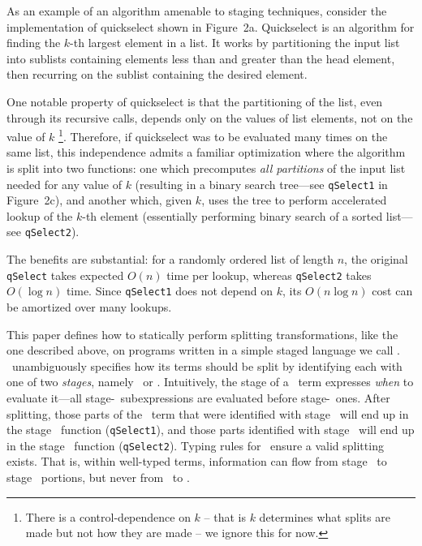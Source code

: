 As an example of an algorithm amenable to staging techniques,
consider the implementation of quickselect shown in Figure~2a.
Quickselect is an algorithm for finding the $k$-th largest element in a list.
It works by partitioning the input list into sublists containing elements less than and greater than the head element, 
then recurring on the sublist containing the desired element.

One notable property of quickselect is that the partitioning of the list, even through its recursive calls, depends only on the values of list elements, not on the value of $k$ 
\footnote{There is a control-dependence on $k$ -- that is $k$ determines what splits are made but not how they are made -- we ignore this for now.}.  Therefore, if quickselect was to be evaluated many times on the same list, this independence admits a familiar optimization where the algorithm is split into two functions: one which precomputes \emph{all partitions} of the input list needed for any value of $k$ (resulting in a binary search tree---see \texttt{qSelect1} in Figure~2c),
and another which, given $k$, uses the tree to perform accelerated lookup of the $k$-th element (essentially performing binary search of a sorted list---see \texttt{qSelect2}).

The benefits are substantial: for a randomly ordered list of length $n$, 
the original \texttt{qSelect} takes expected $O(n)$ time per lookup, 
whereas \texttt{qSelect2} takes $O(\log n)$ time.
Since \texttt{qSelect1} does not depend on $k$, its $O(n\log n)$ cost can be amortized over many lookups.

This paper defines how to statically perform splitting transformations, like the one described above, on programs written in a simple staged language we call \lang.  \lang\ unambiguously specifies how its terms should be split
by identifying each with one of two {\em stages}, namely \bbone\ or \bbtwo.
Intuitively, the stage of a \lang\ term expresses \emph{when} to evaluate it---all stage-\bbone\
subexpressions are evaluated before stage-\bbtwo\ ones.  
After splitting, those parts of the \lang\ term that were identified with stage \bbone\ 
will end up in the stage \bbone\ function ({\tt qSelect1}), 
and those parts identified with stage \bbtwo\ will end up in the stage \bbtwo\ function ({\tt qSelect2}).
Typing rules for \lang\ ensure a valid splitting exists.  That is, 
within well-typed terms, information can flow from stage \bbone\ to stage \bbtwo\ portions,
but never from \bbtwo\ to \bbone.

